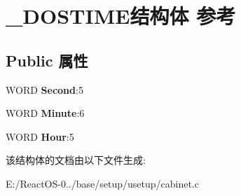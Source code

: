 \hypertarget{struct___d_o_s_t_i_m_e}{}\section{\+\_\+\+D\+O\+S\+T\+I\+M\+E结构体 参考}
\label{struct___d_o_s_t_i_m_e}
\subsection*{Public 属性}
\begin{DoxyCompactItemize}
\item 
\mbox{\label{struct___d_o_s_t_i_m_e_a49b9f81174fe0053bd1908c5d916672d}} 
W\+O\+RD {\bfseries Second}\+:5
\item 
\mbox{\label{struct___d_o_s_t_i_m_e_a4f081e48fd84f4fa383138ee6505d1f8}} 
W\+O\+RD {\bfseries Minute}\+:6
\item 
\mbox{\label{struct___d_o_s_t_i_m_e_ae08f5eb8a56ac1f21539dbec49f48e4c}} 
W\+O\+RD {\bfseries Hour}\+:5
\end{DoxyCompactItemize}


该结构体的文档由以下文件生成\+:\begin{DoxyCompactItemize}
\item 
E\+:/\+React\+O\+S-\/0../base/setup/usetup/cabinet.\+c\end{DoxyCompactItemize}
